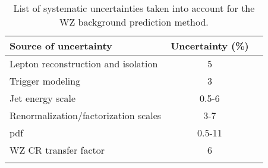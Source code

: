 \begin{table}[!hbtp]
\renewcommand{\arraystretch}{1.2}
\setlength{\belowcaptionskip}{6pt}
\small
\centering
\caption{List of systematic uncertainties taken into account for the WZ background prediction method.}
\begin{tabular}{l c c}
\hline\hline
Source of uncertainty                         & Uncertainty (\%)     \\
\hline
Lepton reconstruction and isolation     &      {5}                   \\ %
Trigger modeling                        &      {3}                   \\ %
Jet energy scale                        &      {0.5-6}                  \\ %
Renormalization/factorization scales    &      {3-7}                 \\ %
pdf                                     &      {0.5-11}                 \\ %
WZ CR transfer factor                   &      {6}                 \\ %
\hline\hline
\label{tab:systematicsWZ}
\end{tabular}
\end{table}


